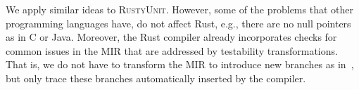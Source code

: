 \documentclass[paper=a4,%
  twoside,%
  BCOR4mm,%
  abstract=true,%
  toc=bibliography,%
  chapterprefix=true,%
  toc=bibliographynumbered,%
  open=right,%
  english,%
  pagesize=pdftex]{scrreprt}
\begin{document}
We apply similar ideas to \textsc{RustyUnit}. However, some of the problems that other programming languages have, do not affect Rust, e.g., there are no null pointers as in C or Java. Moreover, the Rust compiler already incorporates checks for common issues in the \ac{MIR} that are addressed by testability transformations. That is, we do not have to transform the \ac{MIR} to introduce new branches as in~, but only trace these branches automatically inserted by the compiler. 


\end{document}
